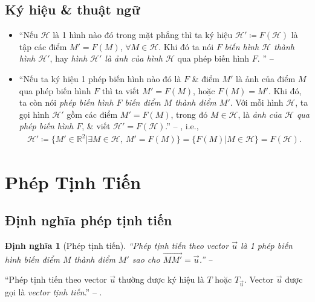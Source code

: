 \documentclass[oneside]{book}
\numberwithin{equation}{section}
\newtheorem{dinhnghia}{Định nghĩa}[section]
\begin{document}
\subsection{Ký hiệu \& thuật ngữ}
\begin{itemize}
	\item ``Nếu $\mathcal{H}$ là 1 hình nào đó trong mặt phẳng thì ta ký hiệu $\mathcal{H}'\coloneqq F(\mathcal{H})$ là tập các điểm $M' = F(M)$, $\forall M\in\mathcal{H}$. Khi đó ta nói $F$ \textit{biến hình $\mathcal{H}$ thành hình $\mathcal{H}'$}, hay \textit{hình $\mathcal{H}'$ là ảnh của hình $\mathcal{H}$} qua phép biến hình $F$.
	'' -- \cite[p. 4]{SGK_Toan_11_hinh_hoc_co_ban}
	\item ``Nếu ta ký hiệu 1 phép biến hình nào đó là $F$ \& điểm $M'$ là ảnh của điểm $M$ qua phép biến hình $F$ thì ta viết $M' = F(M)$, hoặc $F(M) = M'$. Khi đó, ta còn nói \textit{phép biến hình $F$ biến điểm $M$ thành điểm $M'$}. Với mỗi hình $\mathcal{H}$, ta gọi hình $\mathcal{H}'$ gồm các điểm $M' = F(M)$, trong đó $M\in\mathcal{H}$, là \textit{ảnh của $\mathcal{H}$ qua phép biến hình $F$}, \& viết $\mathcal{H}' = F(\mathcal{H})$.'' -- \cite[p. 5]{SGK_Toan_11_hinh_hoc_nang_cao}, i.e.,
	\begin{align*}
		\mathcal{H}'\coloneqq\{M'\in\mathbb{R}^2|\exists M\in\mathcal{H},\ M' = F(M)\} = \{F(M)|M\in\mathcal{H}\} = F(\mathcal{H}).
	\end{align*}
\end{itemize}


\section{Phép Tịnh Tiến}

\subsection{Định nghĩa phép tịnh tiến}

\begin{dinhnghia}[Phép tịnh tiến]
	``\emph{Phép tịnh tiến} theo vector $\vec{u}$ là 1 phép biến hình biến điểm $M$ thành điểm $M'$ sao cho $\overrightarrow{MM'} = \vec{u}$.'' -- \cite[p. 5]{SGK_Toan_11_hinh_hoc_nang_cao}
\end{dinhnghia}
``Phép tịnh tiến theo vector $\vec{u}$ thường được ký hiệu là $T$ hoặc $T_{\vec{u}}$. Vector $\vec{u}$ được gọi là \textit{vector tịnh tiến}.'' -- \cite[p. 5]{SGK_Toan_11_hinh_hoc_nang_cao}.
\end{document}
